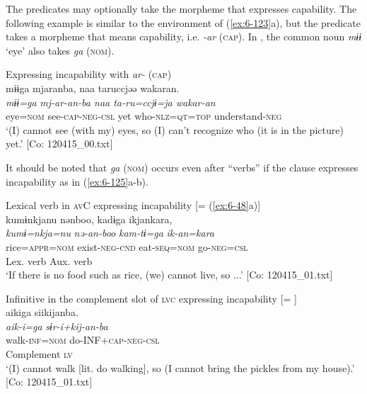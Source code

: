 The predicates may optionally take the morpheme that expresses capability. The following example is similar to the environment of (\ref{ex:6-123}a), but the predicate takes a morpheme that means capability, i.e. \textit{-ar} (\textsc{cap}). In , the common noun \textit{mɨɨ} ‘eye’ also takes \textit{ga} (\textsc{nom}).

\ea\label{ex:6-124}
 Expressing incapability with \textit{ar-} (\textsc{cap})\\

{\TM}
\glll mɨɨga  mjaranba,  naa  taruccjəə  wakaran.\\
\textit{mɨɨ=ga}  \textit{mj-ar-an-ba  naa  ta-ru=ccjɨ=ja  wakar-an}\\
    eye=\textsc{nom}  see-\textsc{cap}-\textsc{neg}-\textsc{csl}  yet  who-\textsc{nlz}=\textsc{qt}=\textsc{top}  understand-\textsc{neg}\\
\glt    ‘(I) cannot see (with my) eyes, so (I) can’t recognize who (it is in the picture) yet.’ [Co: 120415\_00.txt]
\z

It should be noted that \textit{ga} (\textsc{nom}) occurs even after “verbs” if the clause expresses incapability as in (\ref{ex:6-125}a-b).

\ea\label{ex:6-125}
 \ea Lexical verb in \textsc{av}C expressing incapability [= (\ref{ex:6-48}a)]\\

 {\TM}
\glll kumɨnkjanu  nənboo,  kadɨga  ikjankara,\\
\textit{kumɨ=nkja=nu}  \textit{nə-an-boo}  \textit{kam-tɨ=ga}  \textit{ik-an=kara}\\
    rice=\textsc{appr}=\textsc{nom}  exist-\textsc{neg}-\textsc{cnd}  eat-\textsc{seq}=\textsc{nom}  go-\textsc{neg}=\textsc{csl}\\
        Lex. verb  Aux. verb\\
\glt    ‘If there is no food such as rice, (we) cannot live, so ...’ [Co: 120415\_01.txt]

\ex Infinitive in the complement slot of \textsc{lvc} expressing incapability [= ]\\

{\TM}
\glll aikiga  siikijanba.\\
\textit{aik-i=ga}  \textit{sɨr-i+kij-an-ba}\\
    walk-\textsc{inf}=\textsc{nom}  do-INF+\textsc{cap}-\textsc{neg}-\textsc{csl}\\
    Complement  \textsc{lv}\\
\glt    ‘(I) cannot walk [lit. do walking], so (I cannot bring the pickles from my house).’  [Co: 120415\_01.txt]
\z
\z

